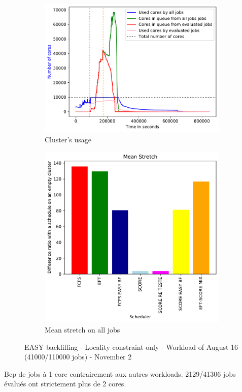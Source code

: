 \documentclass[a4paper]{article}
\begin{document}
\begin{figure}[H]\centering
\begin{subfigure}[b]{0.4\linewidth}\centering\includegraphics[width=1\linewidth]{MBSS/plot/2022-08-16->2022-08-16_V9271_Fcfs_Used_nodes_450_128_32_256_4_1024.pdf}\caption{Cluster's usage}\end{subfigure}
\begin{subfigure}[b]{0.4\linewidth}\centering\includegraphics[width=0.9\linewidth]{MBSS/plot/Results_FCFS_Score_Easy_Backfill_2022-08-16->2022-08-16_V9271_Mean_Stretch_450_128_32_256_4_1024.pdf}\caption{Mean stretch on all jobs}\end{subfigure}
\caption{EASY backfilling - Locality constraint only - Workload of August 16 (41000/110000 jobs) - November 2}\end{figure}
Bcp de jobs à 1 core contrairement aux autres workloads.
2129/41306 jobs évalués ont strictement plus de 2 cores.
\end{document}
